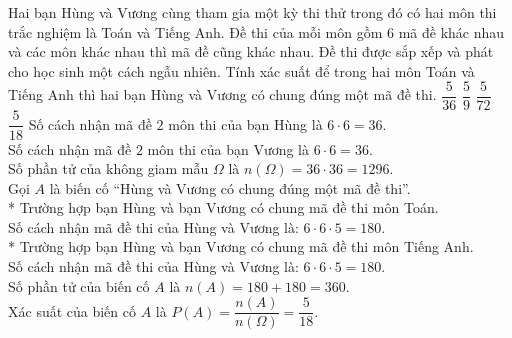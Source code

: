 \begin{ex}%
 Hai bạn Hùng và Vương cùng tham gia một kỳ thi thử trong đó có hai môn thi trắc nghiệm là Toán và Tiếng Anh. Đề thi của mỗi môn gồm $6$ mã đề khác nhau và các môn khác nhau thì mã đề cũng khác nhau. Đề thi được sắp xếp và phát cho học sinh một cách ngẫu nhiên. Tính xác suất để trong hai môn Toán và Tiếng Anh thì hai bạn Hùng và Vương có chung đúng một mã đề thi.
 \choice
  {$\dfrac{5}{36}$}
  {$\dfrac{5}{9}$}
  {$\dfrac{5}{72}$}
  {\True $\dfrac{5}{18}$}
 \loigiai
  {
  Số cách nhận mã đề $2$ môn thi của bạn Hùng là $6 \cdot 6 = 36$.\\
  Số cách nhận mã đề $2$ môn thi của bạn Vương là $6 \cdot 6 = 36$.\\
  Số phần tử của không giam mẫu $\Omega$ là $n(\Omega) = 36 \cdot 36 = 1296$.\\
  Gọi $A$ là biến cố ``Hùng và Vương có chung đúng một mã đề thi''.\\
  * Trường hợp bạn Hùng và bạn Vương có chung mã đề thi môn Toán.\\
  Số cách nhận mã đề thi của Hùng và Vương là: $6 \cdot 6 \cdot 5 = 180$.\\
  * Trường hợp bạn Hùng và bạn Vương có chung mã đề thi môn Tiếng Anh.\\
  Số cách nhận mã đề thi của Hùng và Vương là: $6 \cdot 6 \cdot 5 = 180$.\\
  Số phần tử của biến cố $A$ là $n(A) = 180 + 180 = 360$.\\
  Xác suất của biến cố $A$ là $P(A) = \dfrac{n(A)}{n(\Omega)} = \dfrac{5}{18}$.
  }
\end{ex}


